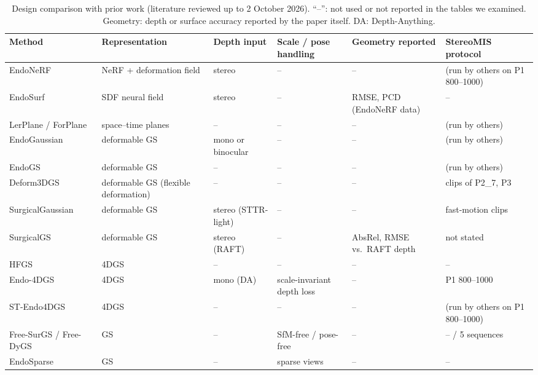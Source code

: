 \documentclass[conference]{IEEEtran}
\begin{document}
\begin{table}[t]
\caption{Design comparison with prior work (literature reviewed up to 2 October 2026). ``--'': not used or not reported in the tables we examined. Geometry: depth or surface accuracy reported by the paper itself. DA: Depth-Anything.}
\label{tab:design}
\centering
\scriptsize
\setlength{\tabcolsep}{3pt}
\renewcommand{\arraystretch}{1.05}
\begin{tabular}{@{}>{\raggedright}p{2.55cm}>{\raggedright}p{2.6cm}>{\raggedright}p{2.35cm}>{\raggedright}p{3.75cm}>{\raggedright}p{2.6cm}>{\raggedright\arraybackslash}p{3.1cm}@{}}
\toprule
Method & Representation & Depth input & Scale / pose handling & Geometry reported & StereoMIS protocol \\
\midrule
EndoNeRF~\cite{wang2022endonerf} & NeRF + deformation field & stereo & -- & -- & (run by others on P1 800--1000) \\
EndoSurf~\cite{zha2023endosurf} & SDF neural field & stereo & -- & RMSE, PCD (EndoNeRF data) & -- \\
LerPlane / ForPlane~\cite{yang2023lerplane,yang2023forplane} & space--time planes & -- & -- & -- & (run by others) \\
EndoGaussian~\cite{liu2024endogaussian} & deformable GS & mono or binocular & -- & -- & (run by others) \\
EndoGS~\cite{zhu2024endogs} & deformable GS & -- & -- & -- & (run by others) \\
Deform3DGS~\cite{yang2024deform3dgs} & deformable GS (flexible deformation) & -- & -- & -- & 3 clips of P2\_7, P3 \\
SurgicalGaussian~\cite{xie2024surgicalgaussian} & deformable GS & stereo (STTR-light) & -- & -- & 2 fast-motion clips \\
SurgicalGS~\cite{chen2024surgicalgs} & deformable GS & stereo (RAFT) & -- & AbsRel, RMSE vs.\ RAFT depth & not stated \\
HFGS~\cite{zhao2024hfgs} & 4DGS & -- & -- & -- & -- \\
Endo-4DGS~\cite{huang2024endo4dgs} & 4DGS & mono (DA) & scale-invariant depth loss & -- & P1 800--1000 \\
ST-Endo4DGS~\cite{li2024stendo4dgs} & 4DGS & -- & -- & -- & (run by others on P1 800--1000) \\
Free-SurGS / Free-DyGS~\cite{guo2024freesurgs,li2024freedygs} & GS & -- & SfM-free / pose-free & -- & -- / 5 sequences \\
EndoSparse~\cite{li2024endosparse} & GS & -- & sparse views & -- & -- \\

\end{tabular}
\end{table}
\end{document}
